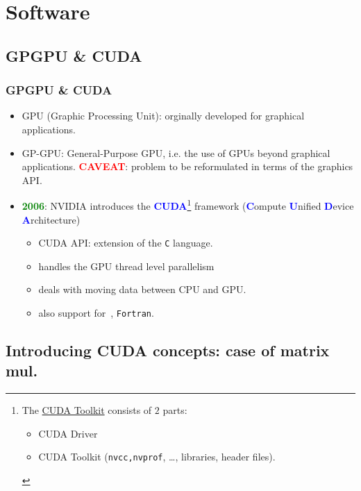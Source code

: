\section{Software}
\subsection{GPGPU \& CUDA}
\begin{frame}
  \frametitle{GPGPU \& CUDA}
     \begin{itemize}
        \item GPU (Graphic Processing Unit):\newline 
	      orginally developed for graphical applications.
        \item GP-GPU: General-Purpose GPU, i.e.\newline 
	      the use of GPUs beyond graphical applications.\newline
	      \textbf{\textcolor{red}{CAVEAT}}: problem to be reformulated in terms of the graphics API.
      \item \textbf{\textcolor{green}{2006}}: NVIDIA introduces the \textbf{\textcolor{blue}{CUDA}}\footnote{The \href{https://developer.nvidia.com/cuda-downloads}{CUDA Toolkit} consists of $2$ parts: 
      \begin{itemize} 
	      \item CUDA Driver 
	      \item CUDA Toolkit (\texttt{nvcc,nvprof}, \ldots, libraries, header files).
      \end{itemize} } framework\newline 
		(\textbf{\textcolor{blue}{C}}ompute \textbf{\textcolor{blue}{U}}nified 
		     \textbf{\textcolor{blue}{D}}evice \textbf{\textcolor{blue}{A}}rchitecture) 
              \begin{itemize}
	         \item CUDA API: extension of the \texttt{C} language.
                 \item handles the GPU thread level parallelism
                 \item deals with moving data between CPU and GPU.
		 \item also support for \CC\,, \texttt{Fortran}.			 
              \end{itemize}			 
     \end{itemize}		     
\end{frame}	

\subsection{Introducing CUDA concepts: case of matrix mul.}
%         

